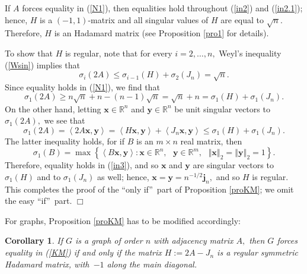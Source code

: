 \documentclass[12pt]{article}%
\newtheorem{corollary}[theorem]{Corollary}
\newenvironment{proof}[1][Proof]{\noindent{\textbf {#1}  }}  {\hfill$\Box$\bigskip}
\begin{document}
\begin{proof}
If $A$ forces equality in (\ref{N1}), then equalities hold throughout
(\ref{in2}) and (\ref{in2.1}); hence, $H$ is a $\left(  -1,1\right)  $-matrix
and all singular values of $H$ are equal to $\sqrt{n}.$ Therefore, $H$ is an
Hadamard matrix (see Proposition \ref{pro1} for details).

To show that $H$ is regular, note that for every $i=2,\ldots,n,$ Weyl's
inequality (\ref{Wsin}) implies that%
\[
\sigma_{i}\left(  2A\right)  \leq\sigma_{i-1}\left(  H\right)  +\sigma
_{2}\left(  J_{n}\right)  =\sqrt{n}.
\]
Since equality holds in (\ref{N1}), we find that
\[
\sigma_{1}\left(  2A\right)  \geq n\sqrt{n}+n-\left(  n-1\right)  \sqrt
{n}=\sqrt{n}+n=\sigma_{1}\left(  H\right)  +\sigma_{1}\left(  J_{n}\right)  .
\]
On the other hand, letting $\mathbf{x}\in\mathbb{R}^{n}$ and $\mathbf{y}%
\in\mathbb{R}^{n}$ be unit singular vectors to $\sigma_{1}\left(  2A\right)
,$ we see that
\begin{equation}
\sigma_{1}\left(  2A\right)  =\left\langle 2A\mathbf{x},\mathbf{y}%
\right\rangle =\left\langle H\mathbf{x},\mathbf{y}\right\rangle +\left\langle
J_{n}\mathbf{x},\mathbf{y}\right\rangle \leq\sigma_{1}\left(  H\right)
+\sigma_{1}\left(  J_{n}\right)  . \label{in3}%
\end{equation}
The latter inequality holds, for if $B$ is an $m\times n$ real matrix, then
\[
\sigma_{1}\left(  B\right)  =\max\left\{  \left\langle B\mathbf{x}%
,\mathbf{y}\right\rangle :\mathbf{x}\in\mathbb{R}^{n},\text{ }\mathbf{y}%
\in\mathbb{R}^{m},\text{ }\left\Vert \mathbf{x}\right\Vert _{2}=\left\Vert
\mathbf{y}\right\Vert _{2}=1\right\}  .
\]
Therefore, equality holds in (\ref{in3}), and so $\mathbf{x}$ and $\mathbf{y}$
are singular vectors to $\sigma_{1}\left(  H\right)  $ and to $\sigma
_{1}\left(  J_{n}\right)  $ as well; hence, $\mathbf{x}=\mathbf{y}%
=n^{-1/2}\mathbf{j}_{n},$ and so $H$ is regular. This completes the proof of
the \textquotedblleft only if\textquotedblright\ part of Proposition
\ref{proKM}; we omit the easy \textquotedblleft if\textquotedblright\ part.
\end{proof}

For graphs, Proposition \ref{proKM} has to be modified accordingly:

\begin{corollary}
If $G$ is a graph of order $n$ with adjacency matrix $A,$ then $G$ forces
equality in (\ref{KM}) if and only if the matrix $H:=2A-J_{n}$ is a regular
symmetric Hadamard matrix, with\ $-1$ along the main diagonal.
\end{corollary}
\end{document}
